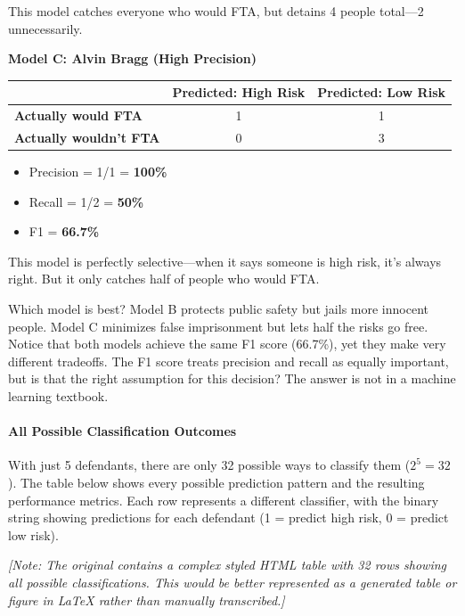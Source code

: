 This model catches everyone who would FTA, but detains 4 people total—2 unnecessarily.

\textbf{Model C: Alvin Bragg (High Precision)}
\begin{table}[H]
\centering
\begin{tabular}{|l|c|c|}
\hline
& \textbf{Predicted: High Risk} & \textbf{Predicted: Low Risk} \\
\hline
\textbf{Actually would FTA} & 1 & 1 \\
\hline
\textbf{Actually wouldn't FTA} & 0 & 3 \\
\hline
\end{tabular}
\end{table}

\begin{itemize}
\item Precision = 1/1 = \textbf{100\%}
\item Recall = 1/2 = \textbf{50\%}
\item F1 = \textbf{66.7\%}
\end{itemize}

This model is perfectly selective—when it says someone is high risk, it's always right. But it only catches half of people who would FTA.

Which model is best? Model B protects public safety but jails more innocent people. Model C minimizes false imprisonment but lets half the risks go free. Notice that both models achieve the same F1 score (66.7\%), yet they make very different tradeoffs. The F1 score treats precision and recall as equally important, but is that the right assumption for this decision? The answer is not in a machine learning textbook.

\paragraph{All Possible Classification Outcomes}

With just 5 defendants, there are only 32 possible ways to classify them ($2^5 = 32$). The table below shows every possible prediction pattern and the resulting performance metrics. Each row represents a different classifier, with the binary string showing predictions for each defendant (1 = predict high risk, 0 = predict low risk).

\textit{[Note: The original contains a complex styled HTML table with 32 rows showing all possible classifications. This would be better represented as a generated table or figure in LaTeX rather than manually transcribed.]}

